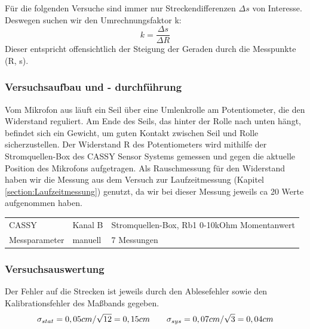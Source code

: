 \documentclass[12pt,a4paper]{article}
\begin{document}
	Für die folgenden Versuche sind immer nur Streckendifferenzen $\Delta s$ von Interesse. Deswegen suchen wir den Umrechnungsfaktor k:
	\begin{equation}
	k = \frac{\Delta s}{\Delta R}
	\end{equation}
	Dieser entspricht offensichtlich der Steigung der Geraden durch die Messpunkte (R, s).
	
	\subsubsection{Versuchsaufbau und - durchführung}

	Vom Mikrofon aus läuft ein Seil über eine Umlenkrolle am Potentiometer, die den Widerstand reguliert. Am Ende des Seils, das hinter der Rolle nach unten hängt, befindet sich ein Gewicht, um guten Kontakt zwischen Seil und Rolle sicherzustellen. Der Widerstand R des Potentiometers wird mithilfe der Stromquellen-Box des CASSY Sensor Systems gemessen und gegen die aktuelle Position des Mikrofons aufgetragen. Als Rauschmessung für den Widerstand haben wir die Messung aus dem Versuch zur Laufzeitmessung (Kapitel \ref{section:Laufzeitmessung}) genutzt, da wir bei dieser Messung jeweils ca 20 Werte aufgenommen haben.\\
	
	\begin{tabular}{l l l}
		
		CASSY & Kanal B & Stromquellen-Box, Rb1 0-10kOhm Momentanwert \\ 
		 
		Messparameter & manuell &  7 Messungen\\ 
		
	\end{tabular} 
	
	\subsubsection{Versuchsauswertung}
	Der Fehler auf die Strecken ist jeweils durch den Ablesefehler sowie den Kalibrationsfehler des Maßbands gegeben.
	\begin{equation}
	\sigma _{stat} = 0,05 cm / \sqrt{12} = 0,15 cm \text{\qquad} \sigma_{sys} = 0,07 cm / \sqrt{3} = 0,04 cm
	\end{equation}
\end{document}
